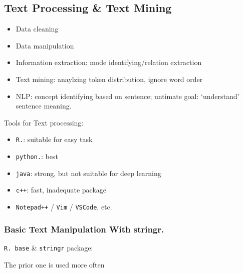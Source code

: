 \subsection{Text Processing \& Text Mining}
    \begin{itemize}[topsep=2pt,itemsep=0pt]
        \item Data cleaning
        \item Data manipulation
        \item Information extraction: mode identifying/relation extraction
        \item Text mining: anaylzing token distribution, ignore word order
        \item NLP: concept identifying based on sentence; untimate goal: `understand' sentence meaning.
    \end{itemize}
    
    Tools for Text processing:
\begin{itemize}[topsep=2pt,itemsep=0pt]
    \item \lstinline|R.|: suitable for easy task 
    \item \lstinline|python.|: best
    \item \lstinline|java|: strong, but not suitable for deep learning
    \item \lstinline|c++|: fast, inadequate package
    \item \lstinline|Notepad++| / \lstinline|Vim| / \lstinline|VSCode|, etc.
\end{itemize}

    
        



\subsubsection{Basic Text Manipulation With stringr.}
\begin{point}
    \lstinline|R. base| \& \lstinline|stringr| package:
\end{point}

    The prior one is used more often

